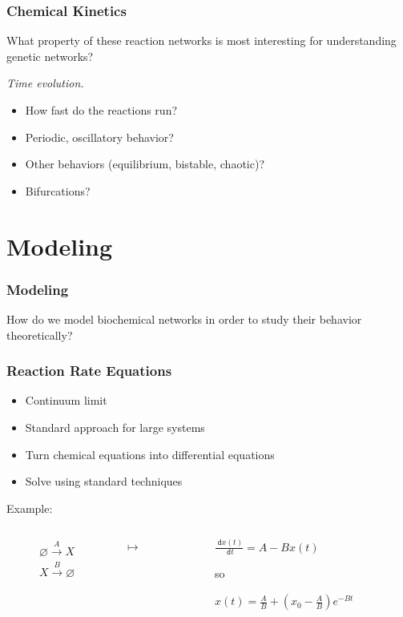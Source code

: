 \documentclass[xcolor={usenames,dvipsnames,svgnames}]{beamer}
\newcommand{\dee}{\;\mathsf{d}}
\begin{document}
\begin{frame}
    \frametitle{Chemical Kinetics}
    What property of these reaction networks is most interesting for understanding genetic networks?
    \pause

    \emph{Time evolution.}
    \begin{itemize}
        \item How fast do the reactions run?
        \item Periodic, oscillatory behavior?
        \item Other behaviors (equilibrium, bistable, chaotic)?
        \item Bifurcations?
    \end{itemize}
\end{frame}


\section{Modeling} %
\label{sec:modeling}

\begin{frame}
    \frametitle{Modeling}
    How do we model biochemical networks in order to study their behavior theoretically?
\end{frame}

\begin{frame}
    \frametitle{Reaction Rate Equations}
    \begin{itemize}
        \item Continuum limit
        \item Standard approach for large systems
        \item Turn chemical equations into differential equations
        \item Solve using standard techniques
    \end{itemize}
    \pause
    Example:
    \begin{columns}[c]
        \begin{column}{0.45\textwidth}
            \begin{align*}
                \varnothing \xrightarrow{A} X \\
                X \xrightarrow {B} \varnothing
            \end{align*}
        \end{column}
        \begin{column}{0.1\textwidth}
            \huge $\mapsto$
        \end{column}
        \begin{column}{0.45\textwidth}
            \begin{center}
                $\frac{\dee x(t)}{\dee t} = A - B x(t)$

                so

                $x(t) = \frac{A}{B} + \left(x_0 - \frac{A}{B}\right) e^{-B t}$
            \end{center}
        \end{column}
    \end{columns}
\end{frame}
\end{document}
